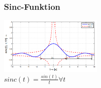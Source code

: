 \begin{multicols}{2}
  \subsubsection*{Sinc-Funktion}
  \includegraphics[width=5cm]{include/Wichtige Funktionen/img/SincFunktion.png}
  \footnotesize
  \\ $sinc(t) = \frac{sin(t)}{t} \forall t$                                                                                   \\
\end{multicols}
